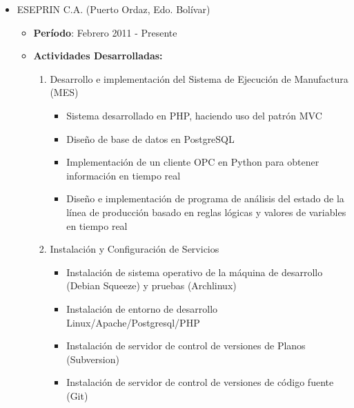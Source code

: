 \documentclass[letterpaper,12pt]{report}
\begin{document}
    \begin{itemize}

        \item{ESEPRIN C.A. (Puerto Ordaz, Edo. Bolívar)}
        \begin{itemize}
        \item{\textbf{Período}: Febrero 2011 - Presente}
        \item{\textbf{Actividades Desarrolladas:}}
            \begin{enumerate}
            \item Desarrollo e implementación del Sistema de Ejecución de Manufactura (MES)
                \begin{itemize}
                \item Sistema desarrollado en PHP, haciendo uso del patrón MVC
                \item Diseño de base de datos en PostgreSQL
                \item Implementación de un cliente OPC en Python para obtener información en tiempo real
                \item Diseño e implementación de programa de análisis del estado de la línea de producción basado en reglas lógicas y valores de variables en tiempo real
                \end{itemize}
            \item Instalación y Configuración de Servicios
                \begin{itemize}
                \item Instalación de sistema operativo de la máquina de desarrollo (Debian Squeeze) y pruebas (Archlinux)
                \item Instalación de entorno de desarrollo Linux/Apache/Postgresql/PHP
                \item Instalación de servidor de control de versiones de Planos (Subversion)
                \item Instalación de servidor de control de versiones de código fuente (Git)
                \end{itemize}
            \end{enumerate}
        \end{itemize}
    

\end{itemize}
\end{document}

